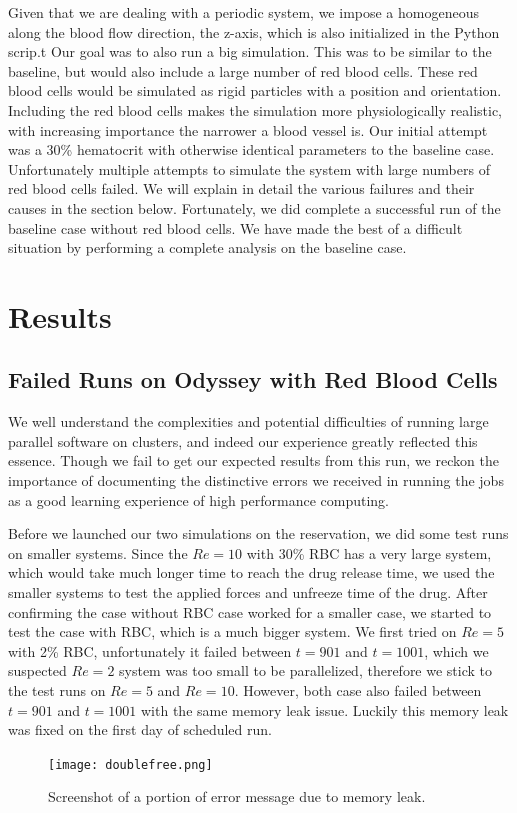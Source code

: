 \documentclass[11pt]{article} %
\begin{document}
Given that we are dealing with a periodic system, we impose a homogeneous along the blood flow direction, the z-axis, which is also initialized in the Python scrip.t Our goal was to also run a big simulation.  
This was to be similar to the baseline, but would also include a large number of red blood cells.
These red blood cells would be simulated as rigid particles with a position and orientation.
Including the red blood cells makes the simulation more physiologically realistic,
with increasing importance the narrower a blood vessel is.
Our initial attempt was a 30\% hematocrit with otherwise identical parameters to the baseline case.  
Unfortunately multiple attempts to simulate the system with large numbers of red blood cells failed.
We will explain in detail the various failures and their causes in the section below.
Fortunately, we did complete a successful run of the baseline case without red blood cells.
We have made the best of a difficult situation by performing a complete analysis on the baseline case.

\newpage
\section{Results}

\subsection{Failed Runs on Odyssey with Red Blood Cells}
We well understand the complexities and potential difficulties of running large parallel software on clusters, and indeed our experience greatly reflected this essence. Though we fail to get our expected results from this run, we reckon the importance of documenting the distinctive errors we received in running the jobs as a good learning experience of high performance computing.

Before we launched our two simulations on the reservation, we did some test runs on smaller systems. Since the $Re=10$ with 30\% RBC has a very large system, which would take much longer time to reach the drug release time, we used the smaller systems to test the applied forces and unfreeze time of the drug. After confirming the case without RBC case worked for a smaller case, we started to test the case with RBC, which is a much bigger system. We first tried on $Re=5$ with 2\%  RBC, unfortunately it failed between $t=901$ and $t=1001$, which we suspected $Re=2$ system was too small to be parallelized, therefore we stick to the test runs on $Re=5$ and $Re=10$. However, both case also failed between $t=901$ and $t=1001$ with the same memory leak issue. Luckily this memory leak was fixed on the first day of scheduled run.
\begin{figure}[H]
    \centering
    \texttt{[image: doublefree.png]}
    \caption{Screenshot of a portion of error message due to memory leak.}
    \label{fig:memory_leak}
\end{figure}
\end{document}
